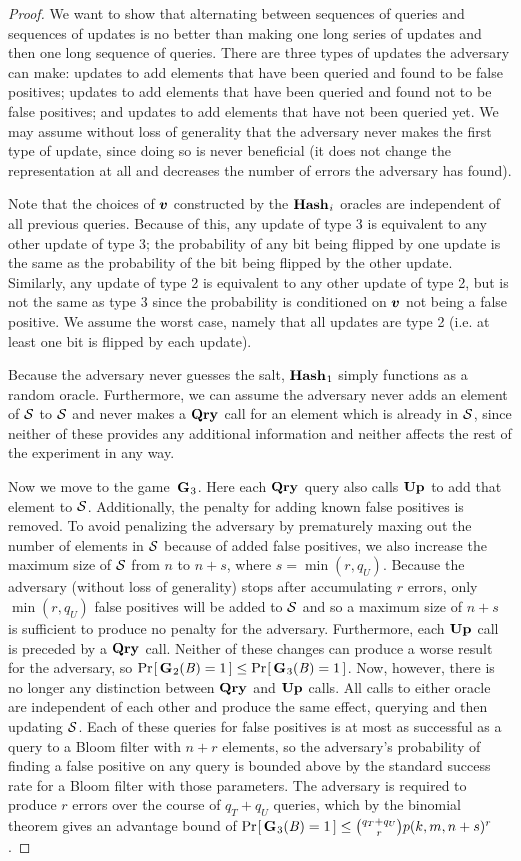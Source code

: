 \begin{proof}
We want to show that alternating between sequences of queries and sequences of updates is no better than making one long series of updates and then one long sequence of queries. There are three types of updates the adversary can make: updates to add elements that have been queried and found to be false positives; updates to add elements that have been queried and found not to be false positives; and updates to add elements that have not been queried yet. We may assume without loss of generality that the adversary never makes the first type of update, since doing so is never beneficial (it does not change the representation at all and decreases the number of errors the adversary has found).

Note that the choices of $\vv$ constructed by the $\mathbf{Hash}\hspace{0.5pt}_i$ oracles are independent of all previous queries. Because of this, any update of type 3 is equivalent to any other update of type 3; the probability of any bit being flipped by one update is the same as the probability of the bit being flipped by the other update. Similarly, any update of type 2 is equivalent to any other update of type 2, but is not the same as type 3 since the probability is conditioned on $\vv$ not being a false positive. We assume the worst case, namely that all updates are type 2 (i.e. at least one bit is flipped by each update).

Because the adversary never guesses the salt, $\mathbf{Hash}\hspace{0.5pt}_1$ simply functions as a random oracle. Furthermore, we can assume the adversary never adds an element of $\mathcal{S}$ to $\mathcal{S}$ and never makes a $\mathbf{Qry}\hspace{0.5pt}$ call for an element which is already in $\mathcal{S}$, since neither of these provides any additional information and neither affects the rest of the experiment in any way.

Now we move to the game~$\mathbf{G}\hspace{0.5pt}_3$. Here each $\mathbf{Qry}\hspace{0.5pt}$ query also calls $\mathbf{Up}\hspace{0.5pt}$ to add that element to $\mathcal{S}$. Additionally, the penalty for adding known false positives is removed. To avoid penalizing the adversary by prematurely maxing out the number of elements in $\mathcal{S}$ because of added false positives, we also increase the maximum size of $\mathcal{S}$ from $n$ to $n+s$, where $s = \min(r,q_U)$. Because the adversary (without loss of generality) stops after accumulating $r$ errors, only $\min(r,q_U)$ false positives will be added to $\mathcal{S}$ and so a maximum size of $n+s$ is sufficient to produce no penalty for the adversary. Furthermore, each $\mathbf{Up}\hspace{0.5pt}$ call is preceded by a $\mathbf{Qry}\hspace{0.5pt}$ call. Neither of these changes can produce a worse result for the adversary, so $\Pr\hspace{-1pt}\left[\,\mathbf{G}\hspace{0.5pt}_2(\mathit{B}) = 1\,\right] \le \Pr\hspace{-1pt}\left[\,\mathbf{G}\hspace{0.5pt}_3(\mathit{B}) = 1\,\right]$. Now, however, there is no longer any distinction between $\mathbf{Qry}\hspace{0.5pt}$ and $\mathbf{Up}\hspace{0.5pt}$ calls. All calls to either oracle are independent of each other and produce the same effect, querying and then updating $\mathcal{S}$. Each of these queries for false positives is at most as successful as a query to a Bloom filter with $n+r$ elements, so the adversary's probability of finding a false positive on any query is bounded above by the standard success rate for a Bloom filter with those parameters. The adversary is required to produce $r$ errors over the course of $q_T+q_U$ queries, which by the binomial theorem gives an advantage bound of $\Pr\hspace{-1pt}\left[\,\mathbf{G}\hspace{0.5pt}_3(\mathit{B}) = 1\,\right] \le \binom{q_T+q_U}{r}p(k, m, n+s)^r$.


\end{proof}
